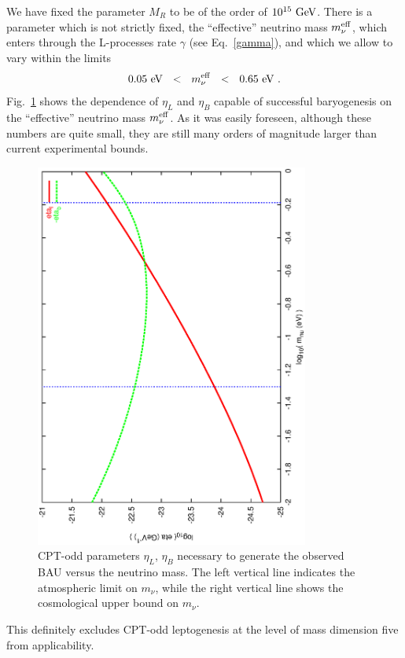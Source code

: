 \documentclass[12pt]{revtex4}
\newcommand{\meff}{m^{\rm eff}_\nu}
\newcommand{\GeV}{{\rm GeV}}
\newcommand{\eV}{{\rm eV}}
\begin{document}
	We have fixed the parameter $ M_R $ to be of the order of 
	$ 10^{15}~\GeV $.
	There is a parameter which is not strictly fixed,
	the ``effective'' neutrino mass $ \meff $, which enters
	through the
	L-processes rate $ \gamma $ (see Eq.~\eqref{gamma}),
	and which we allow to vary within the limits 
\[
	0.05~\eV ~~<~~ \meff ~~<~~0.65~\eV~.
\]
	Fig.~\ref{scan_fig} shows the dependence of $ \eta_L $ and 
	$ \eta_B $ capable
	of successful baryogenesis on the ``effective'' neutrino mass
	$ \meff $.
	As it was easily foreseen, although these numbers are quite
	small, they are still many orders of magnitude larger than
	current experimental bounds.
\begin{figure}
\includegraphics[width=9cm,angle=270]{scan_log.ps}
\caption{CPT-odd parameters $ \eta_L $, $ \eta_B $ necessary to generate
	the observed BAU versus the neutrino mass.
	The left vertical line indicates the atmospheric limit on $ m_\nu $,
	while the right vertical line shows the cosmological upper 
	bound on $ m_\nu $.}
\label{scan_fig}
\end{figure}
	This definitely excludes CPT-odd leptogenesis at the level of
	mass dimension five from applicability.
\end{document}
